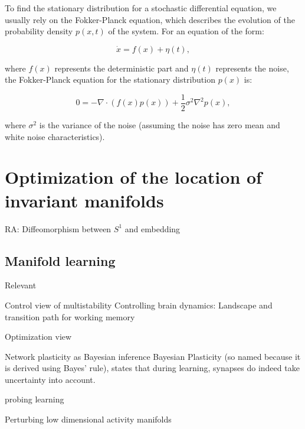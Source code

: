 \documentclass{article}
\theoremstyle{definition} \newtheorem{definition}{Definition}
\theoremstyle{remark} \newtheorem{remark}{Remark}
\newcounter{ct}
\begin{document}
To find the stationary distribution for a stochastic differential equation, we usually rely on the Fokker-Planck equation, which describes the evolution of the probability density \( p(x,t) \) of the system. For an equation of the form:

\[
\dot{x} = f(x) + \eta(t),
\]

where \( f(x) \) represents the deterministic part and \( \eta(t) \) represents the noise, the Fokker-Planck equation for the stationary distribution \( p(x) \) is:

\[
0 = -\nabla \cdot ( f(x) p(x) ) + \frac{1}{2} \sigma^2 \nabla^2 p(x),
\]

where \( \sigma^2 \) is the variance of the noise (assuming the noise has zero mean and white noise characteristics).




\section{Optimization of the location of invariant manifolds} %
\citep{agrachev2009controllability,agrachev2022control}

RA: Diffeomorphism between $S^1$  and embedding

\citep{ocko2018emergent}

\subsection{Manifold learning}
\citep{huys2014functional}
Relevant \citep{chang2023novo}

Control view \citep{pisarchik2014control} of multistability
Controlling brain dynamics: Landscape and transition path for working memory \citep{ye2023wm}
\citep{badre2021dimensionality}
\citep{altan2023control}

Optimization view \citep{hennig2021learningoptimization}

\citep{kumar2023bundle}

Network plasticity as Bayesian inference\citep{kappel2015network,aitchison2021synaptic}
Bayesian Plasticity (so named because it is derived using Bayes' rule), states that during learning, synapses do indeed take uncertainty into account.

probing learning \citep{marschall2023probing}

Perturbing low dimensional activity manifolds \citep{warnberg2019perturbing}
\end{document}
